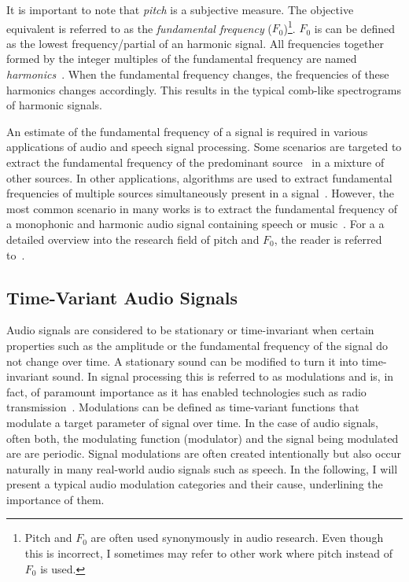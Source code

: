It is important to note that \emph{pitch} is a subjective measure.
The objective equivalent is referred to as the \emph{fundamental frequency} (\(F_0\))\footnote{Pitch and $F_{0}$ are often used synonymously in audio research. Even though this is incorrect, I sometimes may refer to other work where pitch instead of $F_{0}$ is used.}.
\(F_{0}\) is can be defined as the lowest frequency/partial of an harmonic signal.
All frequencies together formed by the integer multiples of the fundamental frequency are named \textit{harmonics}~\cite{schenker54}.
When the fundamental frequency changes, the frequencies of these harmonics changes accordingly.
This results in the typical comb-like spectrograms of harmonic signals.
\par
An estimate of the fundamental frequency of a signal is required in various applications of audio and speech signal processing.
Some scenarios are targeted to extract the fundamental frequency of the predominant source~\cite{salamon12} in a mixture of other sources.
In other applications, algorithms are used to extract fundamental frequencies of multiple sources simultaneously present in a signal~\cite{klapuri03}.
However, the most common scenario in many works is to extract the fundamental frequency of a monophonic and harmonic audio signal containing speech or music~\cite{talkin95, boersma02, decheveigne02, resch07, tidhar10, christensen07}.
For a a detailed overview into the research field of pitch and \(F_{0}\), the reader is referred to~\cite{klapuri06book}.

\subsection{Time-Variant Audio Signals}

Audio signals are considered to be stationary or time-invariant when certain properties such as the amplitude or the fundamental frequency of the signal do not change over time.
A stationary sound can be modified to turn it into time-invariant sound. 
In signal processing this is referred to as modulations and is, in fact, of paramount importance as it has enabled technologies such as radio transmission~\cite{shannon48}.
Modulations can be defined as time-variant functions that modulate a target parameter of signal over time.
In the case of audio signals, often both, the modulating function (modulator) and the signal being modulated are are periodic.
Signal modulations are often created intentionally but also occur naturally in many real-world audio signals such as speech.
In the following, I will present a typical audio modulation categories and their cause, underlining the importance of them.

